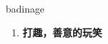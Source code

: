 
\begin{frame}
{\huge badinage}
\begin{center}
\begin{enumerate}\Large
  \item \textbf{打趣，善意的玩笑}
\end{enumerate}
\end{center}
\end{frame}
